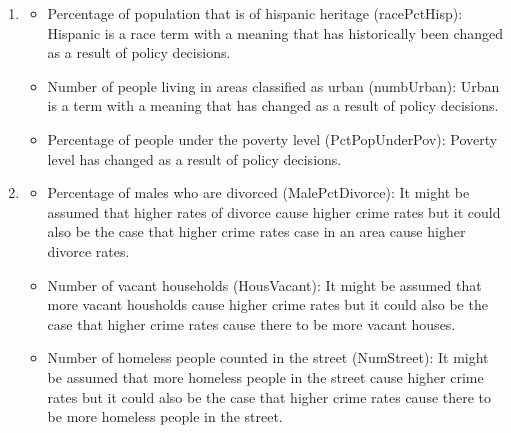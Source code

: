 \begin{enumerate}
    \item
	\begin{itemize}
	    \item Percentage of population that is of hispanic heritage (racePctHisp): Hispanic is a race term with a meaning that has historically been changed as a result of policy decisions.  
	    \item Number of people living in areas classified as urban (numbUrban): Urban is a term with a meaning that has changed as a result of policy decisions.
	    \item Percentage of people under the poverty level (PctPopUnderPov): Poverty level has changed as a result of policy decisions.
	\end{itemize}
    \item
	\begin{itemize}
	    \item Percentage of males who are divorced (MalePctDivorce): It might be assumed that higher rates of divorce cause higher crime rates but it could also be the case that higher crime rates case in an area cause higher divorce rates.
	    \item Number of vacant households (HousVacant): It might be assumed that more vacant housholds cause higher crime rates but it could also be the case that higher crime rates cause there to be more vacant houses. 
	    \item Number of homeless people counted in the street (NumStreet): It might be assumed that more homeless people in the street cause higher crime rates but it could also be the case that higher crime rates cause there to be more homeless people in the street.
	\end{itemize}
\end{enumerate}

